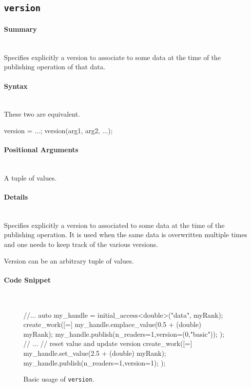 \subsection{\texttt{version}}
\label{ssec:api_fe_version}

\paragraph{Summary}\mbox{}\\ 
Specifies explicitly a version to associate to some data 
at the time of the publishing operation of that data.  


\paragraph{Syntax}\mbox{}\\ 
These two are equivalent.
\begin{CppCode}
version = ...; 
version(arg1, arg2, ...);
\end{CppCode}

\paragraph{Positional Arguments}\mbox{}\\ 
A tuple of values.

\paragraph{Details}\mbox{}\\ 
Specifies explicitly a version to associated to some data 
at the time of the publishing operation.  
It is used when the same data is overwritten multiple times 
and one needs to keep track of the various versions.

Version can be an arbitrary tuple of values.

\paragraph{Code Snippet}\mbox{}\\ 
\begin{figure}[!h]
\begin{CppCodeNumb}
//...
auto my_handle = initial_access<double>("data", myRank);
create_work([=]{
  my_handle.emplace_value(0.5 + (double) myRank);
  my_handle.publish(n_readers=1,version=(0,"basic"));
});
// ...
// reset value and update version
create_work([=]{
  my_handle.set_value(2.5 + (double) myRank);
  my_handle.publish(n_readers=1,version=1);
});
\end{CppCodeNumb}
\label{fig:fe_api_version}
\caption{Basic usage of \texttt{version}.}
\end{figure}



